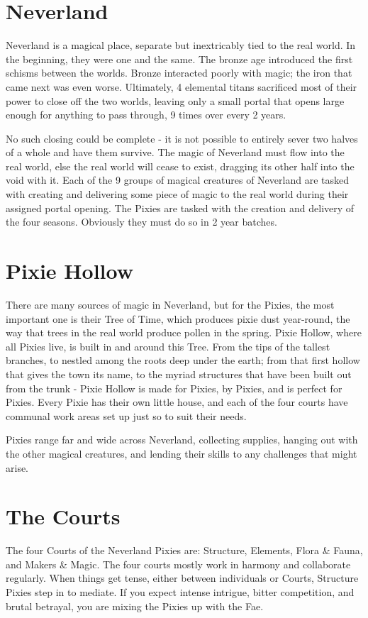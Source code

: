 \documentclass[blue]{PP}
\begin{document}
\name{\bNeverland{}}

\section*{Neverland}
Neverland is a magical place, separate but inextricably tied to the real world. In the beginning, they were one and the same. The bronze age introduced the first schisms between the worlds. Bronze interacted poorly with magic; the iron that came next was even worse. Ultimately, 4 elemental titans sacrificed most of their power to close off the two worlds, leaving only a small portal that opens large enough for anything to pass through, 9 times over every 2 years. 

No such closing could be complete - it is not possible to entirely sever two halves of a whole and have them survive. The magic of Neverland must flow into the real world, else the real world will cease to exist, dragging its other half into the void with it. Each of the 9 groups of magical creatures of Neverland are tasked with creating and delivering some piece of magic to the real world during their assigned portal opening. The Pixies are tasked with the creation and delivery of the four seasons. Obviously they must do so in 2 year batches.

\section*{Pixie Hollow}
There are many sources of magic in Neverland, but for the Pixies, the most important one is their Tree of Time, which produces pixie dust year-round, the way that trees in the real world produce pollen in the spring. Pixie Hollow, where all Pixies live, is built in and around this Tree. From the tips of the tallest branches, to nestled among the roots deep under the earth; from that first hollow that gives the town its name, to the myriad structures that have been built out from the trunk - Pixie Hollow is made for Pixies, by Pixies, and is perfect for Pixies. Every Pixie has their own little house, and each of the four courts have communal work areas set up just so to suit their needs.

Pixies range far and wide across Neverland, collecting supplies, hanging out with the other magical creatures, and lending their skills to any challenges that might arise.

\section*{The Courts}
The four Courts of the Neverland Pixies are: Structure, Elements, Flora \& Fauna, and Makers \& Magic. The four courts mostly work in harmony and collaborate regularly. When things get tense, either between individuals or Courts, Structure Pixies step in to mediate. If you expect intense intrigue, bitter competition, and brutal betrayal, you are mixing the Pixies up with the Fae.
\end{document}
